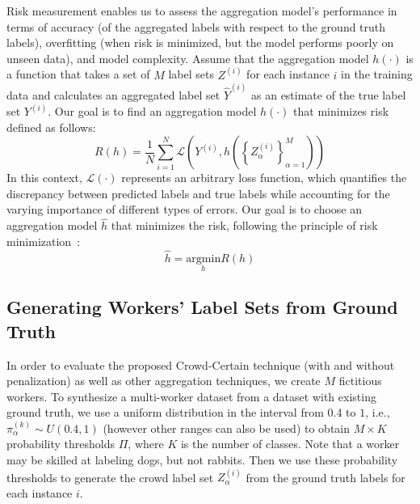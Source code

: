 \documentclass[sn-nature]{bst/sn-jnl}
\begin{document}
Risk measurement enables us to assess the aggregation model's performance in terms of accuracy (of the aggregated labels with respect to the ground truth labels), overfitting (when risk is minimized, but the model performs poorly on unseen data), and model complexity. Assume that the aggregation model $h (\cdot) $ is a function that takes a set of $M $ label sets $Z^{(i)} $ for each instance $i $ in the training data and calculates an aggregated label set $\widehat{Y}^{(i)} $ as an estimate of the true label set $Y^{(i)} $. Our goal is to find an aggregation model $h(\cdot) $ that minimizes risk defined as follows:
\begin{equation}
    R(h) = \frac{1}{N} \sum_{i=1}^{N} \mathcal{L} \left( Y^{(i)}, h\left({\left\{Z_{\alpha}^{(i)}\right\}}_{\alpha=1}^{M}\right)\right)
    \label{eq:crowd.Eq.2.risk.emp}
\end{equation}
In this context, $\mathcal{L}(\cdot) $ represents an arbitrary loss function, which quantifies the discrepancy between predicted labels and true labels while accounting for the varying importance of different types of errors.
Our goal is to choose an aggregation model $\widehat{h} $ that minimizes the risk, following the principle of risk minimization~\cite{vapnik_Principles_1991}:
\begin{equation}
    \widehat{h} = \underset{h}{\text{argmin}}  R(h)
    \label{eq:crowd.Eq.3.risk.h}
\end{equation}
\subsection{Generating Workers' Label Sets from Ground Truth}\label{subsec:methods.generating_fictitious_labelset}
In order to evaluate the proposed Crowd-Certain technique (with and without penalization) as well as other aggregation techniques, we create $M$ fictitious workers. To synthesize a multi-worker dataset from a dataset with existing ground truth, we use a uniform distribution in the interval from $0.4 $ to $1 $, i.e., $\pi_\alpha^{(k)} \sim U\left(0.4,1\right) $ (however other ranges can also be used) to obtain $M \times  K$ probability thresholds $\Pi $, where $K$ is the number of classes. Note that a worker may be skilled at labeling dogs, but not rabbits. Then we use these probability thresholds to generate the crowd label set $Z_{\alpha}^{(i)} $ from the ground truth labels for each instance $i $.
\end{document}
